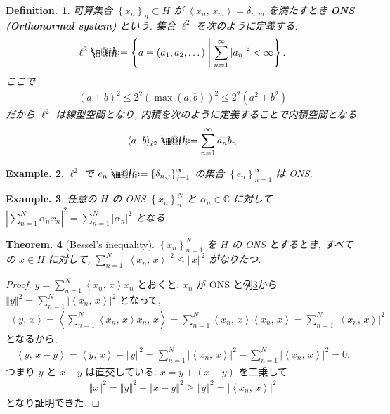 \documentclass[openany, a4paper, oneside]{jsbook}
\makeatletter
\newcommand*{\defeq}{\mathrel{\rlap{%
\raisebox{0.3ex}{$\m@th\cdot$}}%
\raisebox{-0.3ex}{$\m@th\cdot$}}%
=}
\theoremstyle{break}
\newtheorem{thm}{Theorem.}[section]
\theoremstyle{breakdefn}
\newtheorem{defn}[thm]{Definition.}
\newtheorem{ex}[thm]{Example.}
\newcommand{\abs}[1]{\left|#1\right|}
\newcommand{\norm}[1]{\left\Vert#1\right\Vert}
\newcommand{\rbk}[1]{\left (#1\right)}
\newcommand{\cbk}[1]{\left\{#1\right\}}
\newcommand{\bkt}[2]{\left\langle#1,\,#2\right\rangle}
\newcommand{\relmiddle}[1]{\mathrel{}\middle#1\mathrel{}}
\newcommand{\set}[2]{\left\{#1 \relmiddle| #2\right\}}
\newcommand{\bbC}{\mathbb{C}}
\newcommand{\upbf}[1]{\textup{\textbf{#1}}}
\makeatother
\begin{document}
\begin{defn}
 可算集合 $\cbk{x_n}_{n} \subset H$ が $\bkt{x_n}{x_m} = \delta_{n,m} $ を満たすとき \upbf{ONS (Orthonormal system)} という.
 集合 $\ell^2$ を次のように定義する.
 \begin{align}
  \ell^2
  \defeq
  \set{a = \rbk{a_1, a_2, \dots}}{\sum_{n=1}^{\infty} \abs{a_n}^2 < \infty}.
 \end{align}
 ここで
 \begin{align}
  (a+b)^2
  \leq
  2^2 \rbk{\max (a,b)}^2
  \leq
  2^2 (a^2 + b^2)
 \end{align}
 だから $\ell^2$ は線型空間となり,
 内積を次のように定義することで内積空間となる.
 \begin{align}
  \bkt{a}{b}_{\ell^2}
  \defeq
  \sum_{n = 1}^\infty \overline{a_{n}}b_{n}
 \end{align}
\end{defn}
\begin{ex}
 $\ell^2$ で $e_{n} \defeq \cbk{\delta_{n,j}}_{j = 1}^\infty$ の集合 $\cbk{e_{n}}_{n=1}^\infty$ は ONS.
\end{ex}
\begin{ex}\label{functional_analysis_hilbert_space_yukimi_ons}
 任意の $H$ の ONS $\cbk{x_{n}}_{n}^N$ と $\alpha_{n} \in \bbC$ に対して
 $\abs{\sum_{n = 1}^N \alpha_{n} x_{n}}^2 = \sum_{n = 1}^N \abs{\alpha_{n}}^2$ となる.
\end{ex}

\begin{thm}[Bessel's inequality]\label{functional_analysis_hilbert_space_yukimi_Bessel}
 $\cbk{x_{n}}_{n = 1}^N$ を $H$ の ONS とするとき,
 すべての $x \in H$ に対して, $\sum_{n=1}^N \abs{\bkt{x_n}{x}}^2 \leq \norm{x}^2$ がなりたつ.
\end{thm}
\begin{proof}
$y = \sum_{n=1}^N \bkt{x_n}{x} x_{n}$ とおくと,
$x_{n}$ が ONS と例\ref{functional_analysis_hilbert_space_yukimi_ons}から
$\norm{y}^2 = \sum_{n=1}^N \abs{\bkt{x_n}{x}}^2$ となって,
\begin{align}
 \bkt{y}{x}
 =
 \bkt{\sum_{n=1}^N \bkt{x_n}{x} x_n}{x}
 =
 \sum_{n=1}^N \overline{\bkt{x_n}{x}} \bkt{x_n}{x}
 =
 \sum_{n=1}^N \abs{\bkt{x_n}{x}}^2
\end{align}
となるから,
\begin{align}
 \bkt{y}{x - y}
 =
 \bkt{y}{x} - \norm{y}^2
 =
 \sum_{n=1}^N \abs{\bkt{x_n}{x}}^2 - \sum_{n=1}^N \abs{\bkt{x_n}{x}}^2
 = 0.
\end{align}
つまり $y$ と $x-y$ は直交している.
$x = y + (x-y)$ を二乗して
\begin{align}
 \norm{x}^2
 =
 \norm{y}^2 + \norm{x - y}^2
 \geq
 \norm{y}^2
 =
 \abs{\bkt{x_n}{x}}^2
\end{align}
となり証明できた.
\end{proof}
\end{document}
